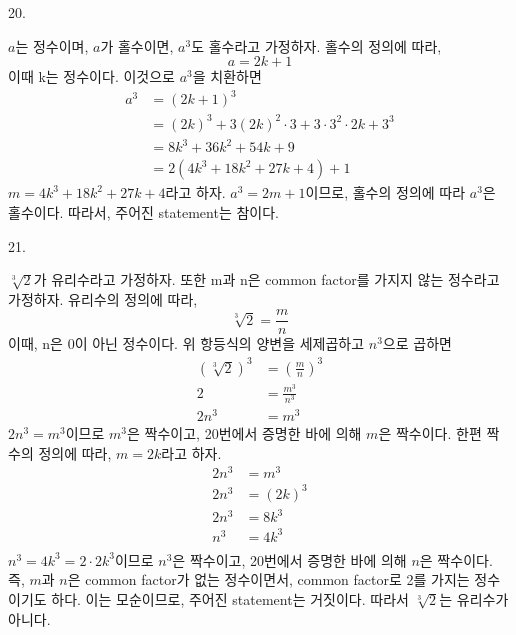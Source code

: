 \documentclass{article}
\begin{document}
20.
\begin{addmargin}[1em]{2em}
$a$는 정수이며, $a$가 홀수이면, $a^3$도 홀수라고 가정하자. 홀수의 정의에 따라,
\[a=2k+1\]
이때 k는 정수이다. 이것으로 $a^3$을 치환하면
\begin{align*}
    a^3 &= (2k+1)^3 \\
    &= (2k)^3 + 3(2k)^2\cdot 3 + 3\cdot 3^2\cdot 2k + 3^3 \\
    &= 8k^3 + 36k^2 + 54k + 9 \\
    &= 2(4k^3 + 18k^2 + 27k + 4) + 1
\end{align*}
$m = 4k^3 + 18k^2 + 27k + 4$라고 하자. $a^3 = 2m + 1$이므로, 홀수의 정의에 따라 $a^3$은 홀수이다.
따라서, 주어진 statement는 참이다.
\end{addmargin}
\bigskip

21.
\begin{addmargin}[1em]{2em}
$\sqrt[3]{2}$가 유리수라고 가정하자. 또한 m과 n은 common factor를 가지지 않는 정수라고 가정하자. 유리수의 정의에 따라,
\[\sqrt[3]{2} = \frac{m}{n}\]
이때, n은 0이 아닌 정수이다. 위 항등식의 양변을 세제곱하고 $n^3$으로 곱하면
\begin{align*}
    (\sqrt[3]{2})^3 &= \left (\frac{m}{n} \right)^3 \\
    2 &= \frac{m^3}{n^3} \\
    2n^3 &= m^3
\end{align*}
$2n^3=m^3$이므로 $m^3$은 짝수이고, 20번에서 증명한 바에 의해 $m$은 짝수이다. 한편 짝수의 정의에 따라, $m=2k$라고 하자.
\begin{align*}
    2n^3 &= m^3 \\
    2n^3 &= (2k)^3 \\
    2n^3 &= 8k^3 \\
    n^3 &= 4k^3 \\
\end{align*}
$n^3 = 4k^3 = 2\cdot 2k^3$이므로 $n^3$은 짝수이고, 20번에서 증명한 바에 의해 $n$은 짝수이다.
\newline
즉, $m$과 $n$은 common factor가 없는 정수이면서, common factor로 2를 가지는 정수이기도 하다. 이는 모순이므로, 주어진 statement는 거짓이다. 따라서 $\sqrt[3]{2}$는 유리수가 아니다.
\end{addmargin}
\bigskip
\end{document}
